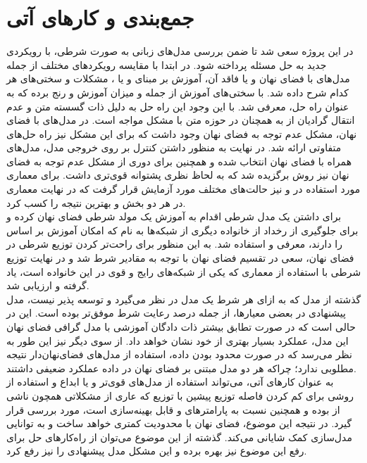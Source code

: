 \chapter{جمع‌بندی و کار‌های آتی}\label{Chap:Chap6}
\minitoc

در این پروژه سعی شد تا ضمن بررسی مدل‌های زبانی به صورت شرطی، با رویکردی جدید به حل مسئله پرداخته شود. در ابتدا با مقایسه رویکرد‌های مختلف از جمله مدل‌های با فضای نهان و یا فاقد آن، آموزش بر مبنای \maxlikelihood{} و یا \gan{}، مشکلات و سختی‌های هر کدام شرح داده شد. \gan{} با سختی‌های آموزش از جمله \modecollapse{} و میزان آموزش \discriminator{} و \generator{} رنج برده که به عنوان راه حل، \wgan{} معرفی شد. با این وجود این راه حل به دلیل ذات گسسته متن و عدم انتقال گرادیان از \discriminator{} به \generator{} همچنان در حوزه متن با مشکل مواجه است.
در مدل‌های با فضای نهان، مشکل عدم توجه به فضای نهان وجود داشت که برای این مشکل نیز راه حل‌های متفاوتی ارائه شد. در نهایت به منظور داشتن کنترل بر روی خروجی مدل، مدل‌های همراه با فضای نهان انتخاب شده و همچنین برای دوری از مشکل عدم توجه به فضای نهان نیز روش \wae{} برگزیده شد که به لحاظ نظری پشتوانه قوی‌تری داشت. برای معماری مورد استفاده در \encoder{} و \decoder{} نیز حالت‌های مختلف مورد آزمایش قرار گرفت که در نهایت معماری \transformer{} در هر دو بخش \encoder{} و \decoder{} بهترین نتیجه را کسب کرد.
\\
برای داشتن یک مدل شرطی اقدام به آموزش یک مولد شرطی فضای نهان کرده و برای جلوگیری از رخداد \modecollapse{} از خانواده دیگری از شبکه‌ها به نام \normalizingflownets{} که امکان آموزش بر اساس \maxlikelihood{} را دارند، معرفی و استفاده شد. به این منظور برای راحت‌تر کردن توزیع شرطی در فضای نهان، سعی در تقسیم فضای نهان با توجه به مقادیر شرط شد و در نهایت توزیع شرطی با استفاده از معماری  که یکی از شبکه‌های رایج و قوی در این خانواده است، یاد گرفته و ارزیابی شد.
\\
گذشته از مدل \sentigan{} که به ازای هر شرط یک مدل در نظر می‌گیرد و توسعه پذیر نیست، مدل پیشنهادی در بعضی معیار‌ها، از جمله درصد رعایت شرط موفق‌تر بوده است. این در حالی است که در صورت تطابق بیشتر ذات دادگان آموزشی با مدل گرافی فضای نهان این مدل، عملکرد بسیار بهتری از خود نشان خواهد داد. از سوی دیگر نیز این طور به نظر می‌رسد که در صورت محدود بودن داده، استفاده از مدل‌های فضای‌نهان‌دار نتیجه مطلوبی ندارد؛ چراکه هر دو مدل مبتنی بر فضای نهان در داده \sst{} عملکرد ضعیفی داشتند.
\\
به عنوان کار‌های آتی، می‌تواند استفاده از مدل‌های قوی‌تر \normalizingflownets{} و یا ابداع و استفاده از روشی برای کم کردن فاصله توزیع پیشین با توزیع \marginal{} \encoder{} که عاری از مشکلاتی همچون \modecollapse{} ناشی از \gan{} بوده و همچنین نسبت به پارامتر‌های \encoder{} و \priordist{} قابل بهینه‌سازی است، مورد بررسی قرار گیرد. در نتیجه این موضوع، \encoder{} فضای نهان با محدودیت کمتری خواهد ساخت و به توانایی مدل‌سازی کمک شایانی می‌کند. گذشته از این موضوع می‌توان از راه‌کارهای حل \expbias{} برای رفع این موضوع نیز بهره برده و این مشکل مدل پیشنهادی را نیز رفع کرد.